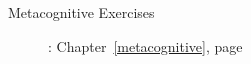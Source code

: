 \documentclass[../main.tex]{subfiles}
\begin{document}
%
\begin{description}
\item[Metacognitive Exercises]: Chapter~\ref{metacognitive}, page~\pageref{metacognitive}
\end{description}
\end{document}
